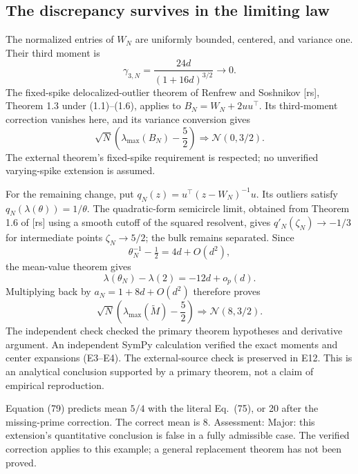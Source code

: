 \documentclass[10pt]{article}
\begin{document}
\subsection*{The discrepancy survives in the limiting law}
The normalized entries of \(W_N\) are uniformly bounded, centered, and variance one. Their third moment is \[\gamma_{3,N}=\frac{24d}{(1+16d)^{3/2}}\to0.\] The fixed-spike delocalized-outlier theorem of Renfrew and Soshnikov [rs], Theorem 1.3 under (1.1)–(1.6), applies to \(B_N=W_N+2uu^\top\). Its third-moment correction vanishes here, and its variance conversion gives \[\sqrt N\left(\lambda_{\max}(B_N)-\frac52\right)
       \Rightarrow \mathcal{N}(0,3/2).\] The external theorem’s fixed-spike requirement is respected; no unverified varying-spike extension is assumed.\par
For the remaining change, put \(q_N(z)=u^\top(z-W_N)^{-1}u\). Its outliers satisfy \(q_N(\lambda(\theta))=1/\theta\). The quadratic-form semicircle limit, obtained from Theorem 1.6 of [rs] using a smooth cutoff of the squared resolvent, gives \(q'_N(\zeta_N)\to-1/3\) for intermediate points \(\zeta_N\to5/2\); the bulk remains separated. Since \[\theta_N^{-1}-\tfrac12=4d+O(d^2),\] the mean-value theorem gives \[\lambda(\theta_N)-\lambda(2)=-12d+o_p(d).\] Multiplying back by \(a_N=1+8d+O(d^2)\) therefore proves \[\boxed{\sqrt N\left(\lambda_{\max}(\widetilde M)-\frac52\right)
          \Rightarrow \mathcal{N}(8,3/2).}\] The independent check checked the primary theorem hypotheses and derivative argument. An independent SymPy calculation verified the exact moments and center expansions (E3–E4). The external-source check is preserved in E12. This is an analytical conclusion supported by a primary theorem, not a claim of empirical reproduction.\par
Equation (79) predicts mean \(5/4\) with the literal Eq. (75), or 20 after the missing-prime correction. The correct mean is 8. Assessment: Major: this extension’s quantitative conclusion is false in a fully admissible case. The verified correction applies to this example; a general replacement theorem has not been proved.\par
\end{document}
